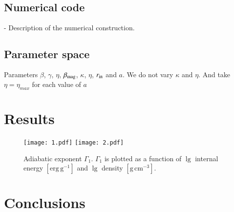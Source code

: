 \documentclass{aa}
\begin{document}
\subsection{Numerical code}

- Description of the numerical construction. 

\subsection{Parameter space}

Parameters $\beta$, $\gamma$, $\eta$, $\beta_{\rm{mag}}$, $\kappa$, $\eta$, $r_{\rm{in}}$ and $a$. We do not vary $\kappa$ and $\eta$. And take $\eta = \eta_{max}$ for each value of $a$

\section{Results}

\begin{figure*}
\centering
\texttt{[image: 1.pdf]}
\texttt{[image: 2.pdf]}
\caption{Adiabatic exponent $\Gamma_1$.
            $\Gamma_1$ is plotted as a function of
            $\lg$ internal energy $\mathrm{[erg\,g^{-1}]}$ and $\lg$
            density $\mathrm{[g\,cm^{-3}]}$.}
           \label{FigGam}%
 \end{figure*}


\section{Conclusions}

%
\end{document}
